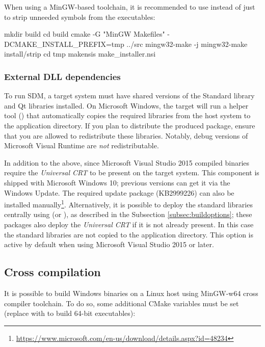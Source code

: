\documentclass[a4paper,12pt,twoside,extrafontsizes]{memoir}
\begin{document}
When using a MinGW-based toolchain, it is recommended to use  instead of just  to strip unneeded symbols from the executables:

\begin{shellcmds}
mkdir build
cd build
cmake -G "MinGW Makefiles" -DCMAKE\_INSTALL\_PREFIX=tmp ../src
mingw32-make -j
mingw32-make install/strip
cd tmp
makensis make\_installer.nsi
\end{shellcmds}

\subsubsection{External DLL dependencies}

To run SDM, a target system must have shared versions of the Standard \cplusplus{} library and Qt libraries installed. On Microsoft Windows, the  target will run a helper tool () that automatically copies the required libraries from the host system to the application directory. If you plan to distribute the produced package, ensure that you are allowed to redistribute these libraries. Notably, debug versions of Microsoft Visual \cplusplus{} Runtime are \emph{not} redistributable.

In addition to the above, since Microsoft Visual Studio 2015 compiled binaries require the \emph{Universal CRT} to be present on the target system. This component is shipped with Microsoft Windows 10; previous versions can get it via the Windows Update. The required update package (KB2999226) can also be installed manually\footnote{\url{https://www.microsoft.com/en-us/download/details.aspx?id=48234}}. Alternatively, it is possible to deploy the standard libraries centrally using  (or ), as described in the Subsection \ref{subsec:buildoptions}; these packages also deploy the \emph{Universal CRT} if it is not already present. In this case the standard libraries are not copied to the application directory. This option is active by default when using Microsoft Visual Studio 2015 or later.

\subsection{Cross compilation}

It is possible to build Windows binaries on a Linux host using MinGW-w64 cross compiler toolchain. To do so, some additional CMake variables must be set (replace  with  to build 64-bit executables):
\end{document}
